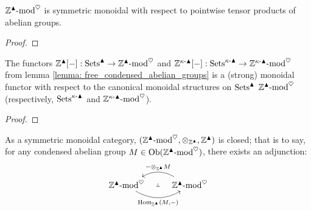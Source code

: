             \begin{lemma} \label{lemma: tensor_products_of_condensed_abelian_groups}
                $\mathbb{Z}^{\blacktriangle}\text{-}\mathrm{mod}^{\heartsuit}$ is symmetric monoidal with respect to pointwise tensor products of abelian groups.
            \end{lemma}
                \begin{proof}
                    
                \end{proof}
            \begin{proposition} \label{prop: forming_free_condensed_abelian_groups_is_monoidal}
                The functors $\mathbb{Z}^{\blacktriangle}[-]: \mathrm{Sets}^{\blacktriangle} \to \mathbb{Z}^{\blacktriangle}\text{-}\mathrm{mod}^{\heartsuit}$ and $\mathbb{Z}^{\kappa\text{-}\blacktriangle}[-]: \mathrm{Sets}^{\kappa\text{-}\blacktriangle} \to \mathbb{Z}^{\kappa\text{-}\blacktriangle}\text{-}\mathrm{mod}^{\heartsuit}$ from lemma \ref{lemma: free_condensed_abelian_groups} is a (strong) monoidal functor with respect to the canonical monoidal structures on $\mathrm{Sets}^{\blacktriangle}$ $\mathbb{Z}^{\blacktriangle}\text{-}\mathrm{mod}^{\heartsuit}$ (respectively, $\mathrm{Sets}^{\kappa\text{-}\blacktriangle}$ and $\mathbb{Z}^{\kappa\text{-}\blacktriangle}\text{-}\mathrm{mod}^{\heartsuit}$).
            \end{proposition}
                \begin{proof}
                    
                \end{proof}
            \begin{proposition} \label{lemma: the_category_of_condensed_abelian_groups_is_monoidally_closed}
                As a symmetric monoidal category, $(\Z^{\cond}\mod^{\heart}, \tensor_{\Z^{\cond}}, \Z^{\cond})$ is closed; that is to say, for any condensed abelian group $M \in \mathrm{Ob}(\mathbb{Z}^{\blacktriangle}\text{-}\mathrm{mod}^{\heartsuit})$, there exists an adjunction:
                    $$
                        \begin{tikzcd}
                        	{\Z^{\cond}\mod^{\heart}} & {\Z^{\cond}\mod^{\heart}}
                        	\arrow[""{name=0, anchor=center, inner sep=0}, "{\Hom_{\Z^{\cond}}(M, -)}"', bend right, from=1-1, to=1-2]
                        	\arrow[""{name=1, anchor=center, inner sep=0}, "{- \tensor_{\Z^{\cond}} M}"', bend right, from=1-2, to=1-1]
                        	\arrow["\dashv"{anchor=center, rotate=-90}, draw=none, from=1, to=0]
                        \end{tikzcd}
                    $$
            \end{proposition}
                
